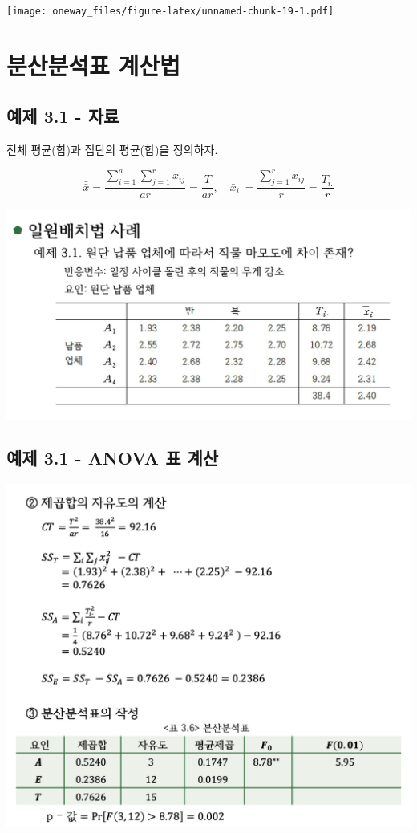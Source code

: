 \documentclass[
]{book}
\begin{document}
\texttt{[image: oneway\_files/figure-latex/unnamed-chunk-19-1.pdf]}

\hypertarget{appendix-appendix}{%
\appendix {}}


\hypertarget{onewayhand}{%
\chapter{분산분석표 계산법}\label{onewayhand}}

\hypertarget{uxc608uxc81c-3.1---uxc790uxb8cc-1}{%
\section{예제 3.1 - 자료}\label{uxc608uxc81c-3.1---uxc790uxb8cc-1}}

전체 평균(합)과 집단의 평균(합)을 정의하자.

\[ \bar{\bar {x}} =  \frac{\sum_{i=1}^a \sum_{j=1}^r x_{ij}}{ar} =\frac{T}{ar}, \quad  \bar {x}_{i.} =   \frac{\sum_{j=1}^r x_{ij}}{r} = \frac{T_{i.}}{r} \]

\includegraphics{oneway-hand-1.png}

\hypertarget{uxc608uxc81c-3.1---anova-uxd45c-uxacc4uxc0b0}{%
\section{예제 3.1 - ANOVA 표 계산}\label{uxc608uxc81c-3.1---anova-uxd45c-uxacc4uxc0b0}}

\includegraphics{oneway-hand-2.png}

  
\end{document}

